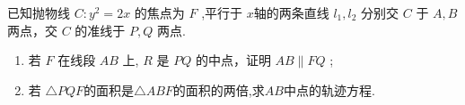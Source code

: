\documentclass[class=ctexart,crop=false]{standalone}
\begin{document}
    
已知抛物线 $C:y^2=2x$ 的焦点为 $F$ ,平行于 $x$轴的两条直线 $l_1,l_2$ 分别交 $C$ 于 $A,B$ 两点，交 $C$ 的准线于 $P,Q$ 两点.

\begin{enumerate}[label=(\Roman*)]
    \item 若 $F$ 在线段 $AB$ 上, $R$ 是 $PQ$ 的中点，证明 $AB\parallel FQ$ ;
    \item 若 $\triangle PQF$的面积是$\triangle ABF$的面积的两倍,求$AB$中点的轨迹方程.
\end{enumerate}
\end{document}
